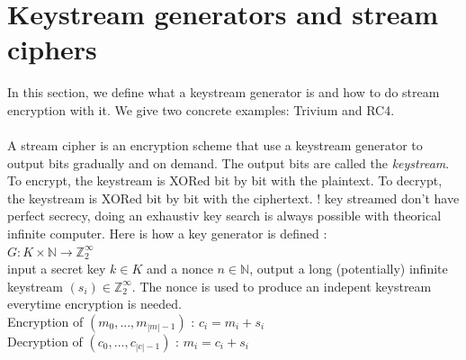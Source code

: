 \documentclass[11pt,a4paper]{report}
\begin{document}
\section{Keystream generators and stream ciphers}
In this section, we define what a keystream generator is and how to do stream encryption with it. We give two concrete examples: Trivium and RC4.\\
\\
A stream cipher is an encryption scheme that use a keystream generator to output bits gradually and on demand. The output bits are called the \emph{keystream}. To encrypt, the keystream is XORed bit by bit with the plaintext. To decrypt, the keystream is XORed bit by bit with the ciphertext. ! key streamed don't have perfect secrecy, doing an exhaustiv key search is always possible with theorical infinite computer. Here is how a key generator is defined :\\

$G : K \times \mathbb{N} \rightarrow \mathbb{Z}_2^\infty$\\
input a secret key $k \in K$ and a \textcolor{ao}{nonce} $n \in \mathbb{N}$, output a long (potentially) infinite keystream $(s_i) \in \mathbb{Z}_2^\infty$. The nonce is used to produce an indepent keystream everytime encryption is needed.\\
Encryption of $(m_0,...,m_{|m|-1} ) $ : $c_i = m_i + s_i$\\
Decryption of $(c_0,...,c_{|c|-1})$ : $m_i = c_i + s_i $\\
\end{document}
